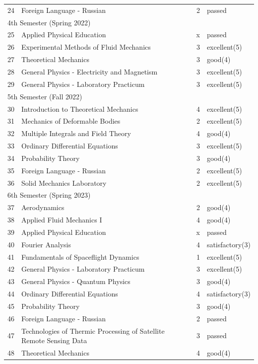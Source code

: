 \documentclass[a4paper, 11pt]{article}
\begin{document}
\begin{longtable}{p{} p{} r l}
24 & Foreign Language - Russian & 2 & passed \\
\multicolumn{4}{l}{4th Semester (Spring 2022)} \\ 
25 & Applied Physical Education & x & passed \\
26 & Experimental Methods of Fluid Mechanics & 3 & excellent(5) \\
27 & Theoretical Mechanics & 3 & good(4) \\
28 & General Physics - Electricity and Magnetism & 3 & excellent(5) \\
29 & General Physics - Laboratory Practicum & 3 & excellent(5) \\
\multicolumn{4}{l}{5th Semester (Fall 2022)} \\ 
30 & Introduction to Theoretical Mechanics & 4 & excellent(5) \\
31 & Mechanics of Deformable Bodies & 2 & excellent(5) \\
32 & Multiple Integrals and Field Theory & 4 & good(4) \\
33 & Ordinary Differential Equations & 3 & excellent(5) \\
34 & Probability Theory & 3 & good(4) \\
35 & Foreign Language - Russian & 2 & excellent(5) \\
36 & Solid Mechanics Laboratory & 2 & excellent(5) \\
\multicolumn{4}{l}{6th Semester (Spring 2023)} \\ 
37 & Aerodynamics & 2 & good(4) \\
38 & Applied Fluid Mechanics I & 4 & good(4) \\
39 & Applied Physical Education & x & passed \\
40 & Fourier Analysis & 4 & satisfactory(3) \\
41 & Fundamentals of Spaceflight Dynamics & 1 & excellent(5) \\
42 & General Physics - Laboratory Practicum & 3 & excellent(5) \\
43 & General Physics - Quantum Physics & 3 & good(4) \\
44 & Ordinary Differential Equations & 4 & satisfactory(3) \\
45 & Probability Theory & 3 & good(4) \\
46 & Foreign Language - Russian & 2 & passed \\
47 & Technologies of Thermic Processing of Satellite Remote Sensing Data & 3 & passed \\
48 & Theoretical Mechanics & 4 & good(4) \\

\end{longtable}
\end{document}
